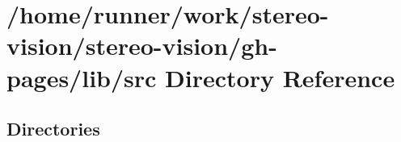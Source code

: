 \section{/home/runner/work/stereo-\/vision/stereo-\/vision/gh-\/pages/lib/src Directory Reference}
\label{dir_a065c5f60305fee3569f887679366939}
\subsection*{Directories}
\begin{DoxyCompactItemize}
\end{DoxyCompactItemize}
